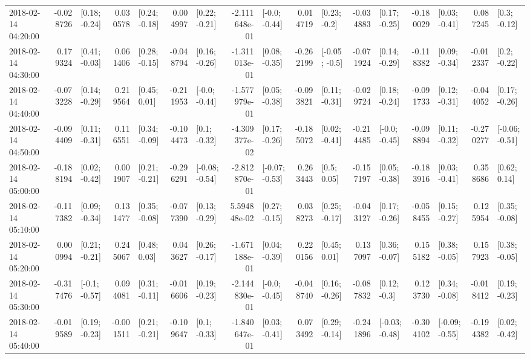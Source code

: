 \begin{tabular}{lrlrlrlrlrlrlrlrl}
2018-02-14 04:20:00 & -0.028726 &   [0.18; -0.24] &  0.030578 &   [0.24; -0.18] &  0.004997 &   [0.22; -0.21] & -2.111648e-01 &   [-0.0; -0.44] &  0.014719 &    [0.23; -0.2] & -0.034883 &   [0.17; -0.25] & -0.180029 &   [0.03; -0.41] &  0.087245 &    [0.3; -0.12] \\
2018-02-14 04:30:00 &  0.179324 &   [0.41; -0.03] &  0.061406 &   [0.28; -0.15] & -0.048794 &   [0.16; -0.26] & -1.311013e-01 &   [0.08; -0.35] & -0.262199 &   [-0.05; -0.5] & -0.071924 &   [0.14; -0.29] & -0.118382 &   [0.09; -0.34] & -0.012337 &    [0.2; -0.22] \\
2018-02-14 04:40:00 & -0.073228 &   [0.14; -0.29] &  0.219564 &    [0.45; 0.01] & -0.211953 &   [-0.0; -0.44] & -1.577979e-01 &   [0.05; -0.38] & -0.093821 &   [0.11; -0.31] & -0.029724 &   [0.18; -0.24] & -0.091733 &   [0.12; -0.31] & -0.044052 &   [0.17; -0.26] \\
2018-02-14 04:50:00 & -0.094409 &   [0.11; -0.31] &  0.116551 &   [0.34; -0.09] & -0.104473 &    [0.1; -0.32] & -4.309377e-02 &   [0.17; -0.26] & -0.185072 &   [0.02; -0.41] & -0.214485 &   [-0.0; -0.45] & -0.098894 &   [0.11; -0.32] & -0.270277 &  [-0.06; -0.51] \\
2018-02-14 05:00:00 & -0.188194 &   [0.02; -0.42] &  0.001907 &   [0.21; -0.21] & -0.296291 &  [-0.08; -0.54] & -2.812870e-01 &  [-0.07; -0.53] &  0.263443 &     [0.5; 0.05] & -0.157197 &   [0.05; -0.38] & -0.183916 &   [0.03; -0.41] &  0.358686 &    [0.62; 0.14] \\
2018-02-14 05:10:00 & -0.117382 &   [0.09; -0.34] &  0.131477 &   [0.35; -0.08] & -0.077390 &   [0.13; -0.29] &  5.594848e-02 &   [0.27; -0.15] &  0.038273 &   [0.25; -0.17] & -0.043127 &   [0.17; -0.26] & -0.058455 &   [0.15; -0.27] &  0.125954 &   [0.35; -0.08] \\
2018-02-14 05:20:00 &  0.000994 &   [0.21; -0.21] &  0.245067 &    [0.48; 0.03] &  0.043627 &   [0.26; -0.17] & -1.671188e-01 &   [0.04; -0.39] &  0.220156 &    [0.45; 0.01] &  0.137097 &   [0.36; -0.07] &  0.155182 &   [0.38; -0.05] &  0.157923 &   [0.38; -0.05] \\
2018-02-14 05:30:00 & -0.317476 &   [-0.1; -0.57] &  0.094081 &   [0.31; -0.11] & -0.016606 &   [0.19; -0.23] & -2.144830e-01 &   [-0.0; -0.45] & -0.048740 &   [0.16; -0.26] & -0.087832 &    [0.12; -0.3] &  0.123730 &   [0.34; -0.08] & -0.018412 &   [0.19; -0.23] \\
2018-02-14 05:40:00 & -0.019589 &   [0.19; -0.23] & -0.001511 &   [0.21; -0.21] & -0.109647 &    [0.1; -0.33] & -1.840647e-01 &   [0.03; -0.41] &  0.073492 &   [0.29; -0.14] & -0.241896 &  [-0.03; -0.48] & -0.304102 &  [-0.09; -0.55] & -0.194382 &   [0.02; -0.42] \\

\end{tabular}
